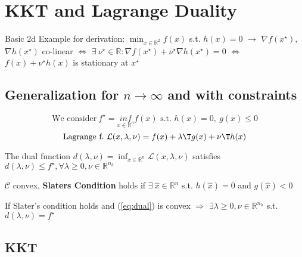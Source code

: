 \section{KKT and Lagrange Duality}

Basic 2d Example for derivation:
$\min _{x \in \mathbb{R}^2} f(x)$ s.t. $h(x)=0$
$\rightarrow$
$\nabla f(x^\star)$, $\nabla h(x^\star)$
co-linear
$\Leftrightarrow$
$\exists\ \nu^\star \in \mathbb{R}: \nabla f(x^\star)+\nu^\star\nabla h(x^\star) = 0$
$\Leftrightarrow$
$f(x)+\nu^\star h(x)$ is stationary at $x^\star$

\subsection{Generalization for $n\rightarrow\infty$ and with constraints}
\begin{equation}
	\text{We consider}\
	f^\star = \underset{x \in \mathcal{\mathbb{R}}^n}{inf}f(x) \text{ s.t. } h(x)=0,\ g(x) \le 0
	\label{eq:dual}
\end{equation}
\begin{equation}
	\text{Lagrange f.}\
	\mathcal{L}(x,\lambda,\nu) = f(x) + \lambda\T g(x)+\nu\T h(x)
\end{equation}

\begin{proposition}
	The dual function
	$d(\lambda,\nu) = \inf_{x \in \mathcal{\mathbb{R}}^n}\mathcal{L}(x,\lambda,\nu)$
	satisfies
	$d(\lambda,\nu)\le f^\star,\forall \lambda\ge 0,\nu \in \mathbb{R}^{n_h}$
\end{proposition}

\begin{definition}
	$\mathcal{C}$ convex, \textbf{Slaters Condition} holds if
	$\exists\ \hat{x} \in \mathbb{R}^{n}$ s.t. $h(\hat{x})=0$ and $g(\hat{x})<0$
\end{definition}

\begin{proposition}
	If Slater's condition holds
	and (\ref{eq:dual}) is convex
	$\Rightarrow$
	$\exists \lambda \ge 0, \nu \in \mathbb{R}^{n_h}$ s.t. $d(\lambda,\nu)=f^\star$
\end{proposition}

\subsection{KKT} %

